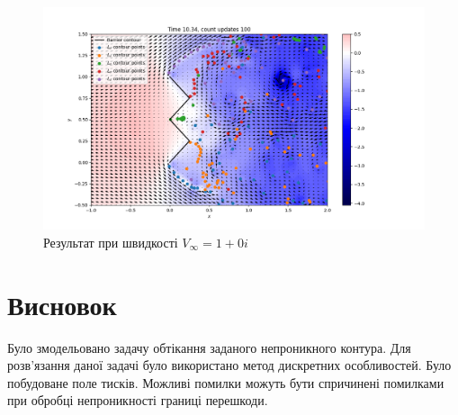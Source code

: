 \documentclass[a4paper,12pt]{article}
\begin{document}
		\begin{figure}[hb]
		\begin{center}\includegraphics[scale=0.45]{form_3_100} \end{center}
		\caption{Результат при швидкості $V_{\infty} = 1 +0i$}
		\label{fig:result_3}
	\end{figure}
	

	\newpage
	\section{Висновок}
	Було змодельовано задачу обтікання заданого непроникного контура. Для розв'язання даної задачі було використано метод дискретних особливостей. Було побудоване поле тисків. Можливі помилки можуть бути спричинені помилками при обробці непроникності границі перешкоди.
	
\end{document}
